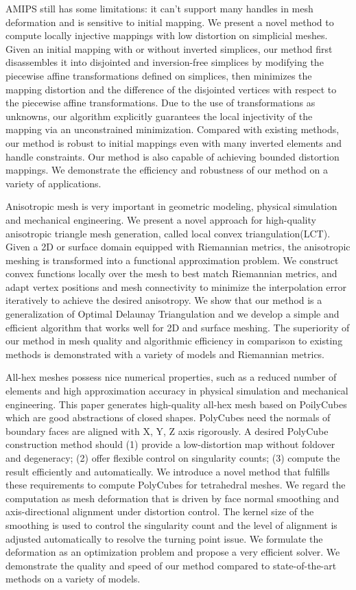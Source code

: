 \begin{enabstract}
AMIPS still has some limitations: it can't support many handles in mesh deformation and is sensitive to initial mapping. We present a novel method to compute locally injective mappings with low distortion on simplicial meshes.  Given an initial mapping with or without inverted simplices, our method first disassembles it into disjointed and inversion-free simplices by modifying the piecewise affine transformations defined on simplices, then minimizes the mapping distortion and the difference of the disjointed vertices with respect to the piecewise affine transformations. Due to the use of transformations as unknowns, our algorithm explicitly guarantees the local injectivity of the mapping via an unconstrained minimization. Compared with existing methods, our method is robust to initial mappings even with many inverted elements and handle constraints. Our method is also capable of achieving bounded distortion mappings. We demonstrate the efficiency and robustness of our method on a variety of applications.

Anisotropic mesh is very important in geometric modeling, physical simulation and mechanical engineering. We present a novel approach for high-quality anisotropic triangle mesh generation, called local convex triangulation(LCT).
Given a 2D or surface domain equipped with Riemannian metrics, the anisotropic meshing is transformed into a functional approximation problem. We construct convex functions locally over the mesh to best match Riemannian metrics, and adapt vertex positions and mesh connectivity to minimize the interpolation error iteratively to achieve the desired anisotropy. We show that our method is a generalization of Optimal Delaunay Triangulation and we develop a simple and efficient algorithm that works well for 2D and surface meshing. The superiority of our method in mesh quality and algorithmic efficiency in comparison to existing methods is demonstrated with a variety of models and Riemannian metrics.

All-hex meshes possess nice numerical properties, such as a reduced number of elements and high approximation accuracy in physical simulation and mechanical engineering. This paper generates high-quality all-hex mesh based on PoilyCubes which are good abstractions of closed shapes. PolyCubes need the normals of boundary faces are aligned with X, Y, Z axis rigorously. A desired PolyCube construction method should (1) provide a low-distortion map without foldover and degeneracy; (2) offer flexible control on singularity counts; (3) compute the result efficiently and automatically. We introduce a novel method that fulfills these requirements to compute PolyCubes for tetrahedral meshes. We regard the computation as mesh deformation that is driven by face normal smoothing and axis-directional alignment under distortion control.
The kernel size of the smoothing is used to control the singularity count and the level of alignment is adjusted automatically to resolve the turning point issue.  We formulate the deformation as an optimization problem and propose a very efficient solver.
We demonstrate the quality and speed of our method compared to state-of-the-art methods on a variety of models.

\end{enabstract}

